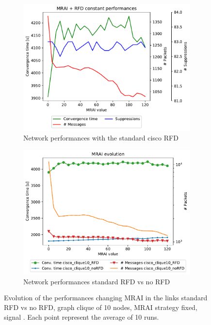 \begin{figure}[h]
     \centering
     \begin{subfigure}[b]{0.49\textwidth}
         \centering
		 \includegraphics[width=\textwidth]{images/RFD/clique/cisco_clique10_RFD-constant_mrai_rfd_evolution.pdf}
		 \caption{Network performances with the standard cisco \ac{RFD}}
		 \label{fig:clique_evolution_rfd}
     \end{subfigure}
     \hfill
     \begin{subfigure}[b]{0.49\textwidth}
         \centering
         \includegraphics[width=\textwidth]{images/RFD/clique/cisco_clique10_comparison_constant_all.pdf}
		 \caption{Network performances standard \ac{RFD} vs no \ac{RFD}}
         \label{fig:clique_evolution_rfd_vs_noRFd_comparison}
     \end{subfigure}
		\caption{Evolution of the performances changing \ac{MRAI} in the links
			standard \ac{RFD} vs no \ac{RFD},
			graph clique of \num{10} nodes, \ac{MRAI} strategy fixed, signal .
			Each point represent the average of \num{10} runs.}
        \label{fig:clique_evolution_rfd_vs_noRFD}
\end{figure}

